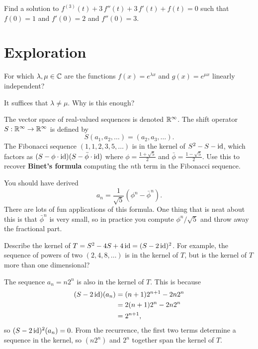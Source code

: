 \documentclass{homework}
\begin{document}
\begin{problem}
  Find a solution to $f^{(3)}(t) + 3 \, f''(t) + 3 \, f'(t) + f(t) = 0$ such that $f(0) = 1$ and $f'(0) = 2$ and $f''(0) = 3$.
\end{problem}

\section{Exploration}

\begin{problem}\label{independent-exponentials}For which $\lambda, \mu \in \mathbb{C}$ are the functions $f(x) = e^{\lambda x}$ and $g(x) = e^{\mu x}$ linearly independent?
\end{problem}

\begin{solution}
  It suffices that $\lambda \neq \mu$.  Why is this enough?
\end{solution}

\begin{problem}\label{fibonacci-sequence}The vector space of real-valued sequences is denoted $\mathbb{R}^\infty$.
  The shift operator $S : \mathbb{R}^\infty \to \mathbb{R}^\infty$ is defined by
  \[
    S(a_1,a_2,\ldots) = (a_2,a_3,\ldots).
  \]
  The Fibonacci sequence $(1,1,2,3,5,\ldots)$ is in the kernel of $S^2 - S - \operatorname{id}$, which factors as $(S- \phi \cdot \operatorname{id})(S - \bar{\phi} \cdot \operatorname{id})$ where $\phi = \frac{1+\sqrt{5}}{2}$ and $\bar{\phi} = \frac{1-\sqrt{5}}{2}$.  Use this to recover \textbf{Binet's formula} computing the $n$th term in the Fibonacci sequence.  
\end{problem}

\begin{solution}
  You should have derived
  \[
    a_n = \frac{1}{\sqrt{5}} \left( \phi^n - \bar{\phi}^n \right).
  \]
  There are lots of fun applications of this formula.  One thing that
  is neat about this is that $\bar{\phi}^n$ is very small, so in
  practice you compute $\phi^n/\sqrt{5}$ and throw away the fractional
  part.
\end{solution}

\begin{problem}\label{shift-repeated-roots}Describe the kernel of $T = S^2 - 4S + 4\operatorname{id} = (S-2\operatorname{id})^2$.  For
  example, the sequence of powers of two $(2,4,8,\ldots)$ is in the
  kernel of $T$, but is the kernel of $T$ more than one dimensional?
\end{problem}

\begin{solution}
  The sequence $a_n = n 2^n$ is also in the kernel of $T$.  This is because
  \begin{align*}
    (S-2\operatorname{id})(a_n) &= (n+1) 2^{n+1} - 2 n 2^n \\
                  &= 2 (n+1) 2^{n} - 2 n 2^n \\
                  &= 2^{n+1},
  \end{align*}
  so $(S-2\operatorname{id})^2(a_n) = 0$.  From the recurrence, the first two terms determine a sequence in the kernel, so $(n 2^n)$ and $2^n$ together span the kernel of $T$.
\end{solution}
\end{document}

